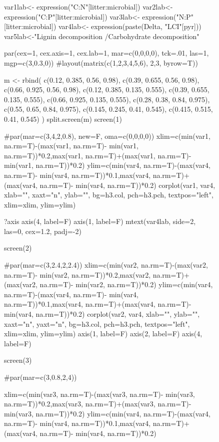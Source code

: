 \documentclass[10pt]{article}
\begin{document}
\begin{flushleft}
\begin{figure}[h!]
\begin{center}
var1lab<- expression("C:N"[litter:microbial])
var2lab<- expression("C:P"[litter:microbial])
var3lab<- expression("N:P"[litter:microbial])
var4lab<- expression(paste(Delta, "LCI"[pyr]))
var5lab<-"Lignin decomposition /\n Carbohydrate decomposition"


    
    

par(cex=1, cex.axis=1, cex.lab=1, mar=c(0,0,0,0), tck=.01, las=1, mgp=c(3,0.3,0))
    #layout(matrix(c(1,2,3,4,5,6), 2,3, byrow=T))
    
    m <- rbind(
      c(0.12, 0.385, 0.56, 0.98),
      c(0.39, 0.655, 0.56, 0.98),
      c(0.66, 0.925, 0.56, 0.98),
      c(0.12, 0.385, 0.135, 0.555),
      c(0.39, 0.655, 0.135, 0.555),
      c(0.66, 0.925, 0.135, 0.555),
      c(0.28, 0.38, 0.84, 0.975),
      c(0.55, 0.65, 0.84, 0.975),
      c(0.145, 0.245, 0.41, 0.545),
      c(0.415, 0.515, 0.41, 0.545)
      )
    split.screen(m)
    screen(1)
    
    
    #par(mar=c(3,4,2,0.8), new=F, oma=c(0,0,0,0))
xlim=c(min(var1, na.rm=T)-(max(var1, na.rm=T)- min(var1, na.rm=T))*0.2,max(var1, na.rm=T)+(max(var1, na.rm=T)- min(var1, na.rm=T))*0.2)
ylim=c(min(var4, na.rm=T)-(max(var4, na.rm=T)- min(var4, na.rm=T))*0.1,max(var4, na.rm=T)+(max(var4, na.rm=T)- min(var4, na.rm=T))*0.2)
corplot(var1, var4, xlab="", xaxt="n", ylab="", bg=h3.col, pch=h3.pch, textpos="left", xlim=xlim, ylim=ylim)

?axis
axis(4, label=F)
axis(1, label=F)
mtext(var4lab, side=2, las=0, cex=1.2, padj=-2)


screen(2)
    
    #par(mar=c(3,2.4,2,2.4))
xlim=c(min(var2, na.rm=T)-(max(var2, na.rm=T)- min(var2, na.rm=T))*0.2,max(var2, na.rm=T)+(max(var2, na.rm=T)- min(var2, na.rm=T))*0.2)
ylim=c(min(var4, na.rm=T)-(max(var4, na.rm=T)- min(var4, na.rm=T))*0.1,max(var4, na.rm=T)+(max(var4, na.rm=T)- min(var4, na.rm=T))*0.2)
corplot(var2, var4, xlab="", ylab="", xaxt="n", yaxt="n", bg=h3.col, pch=h3.pch, textpos="left", xlim=xlim, ylim=ylim)
axis(1, label=F)
axis(2, label=F)
axis(4, label=F)

screen(3)

#par(mar=c(3,0.8,2,4))

xlim=c(min(var3, na.rm=T)-(max(var3, na.rm=T)- min(var3, na.rm=T))*0.2,max(var3, na.rm=T)+(max(var3, na.rm=T)- min(var3, na.rm=T))*0.2)
ylim=c(min(var4, na.rm=T)-(max(var4, na.rm=T)- min(var4, na.rm=T))*0.1,max(var4, na.rm=T)+(max(var4, na.rm=T)- min(var4, na.rm=T))*0.2)



\end{center}
\end{figure}
\end{flushleft}
\end{document}
